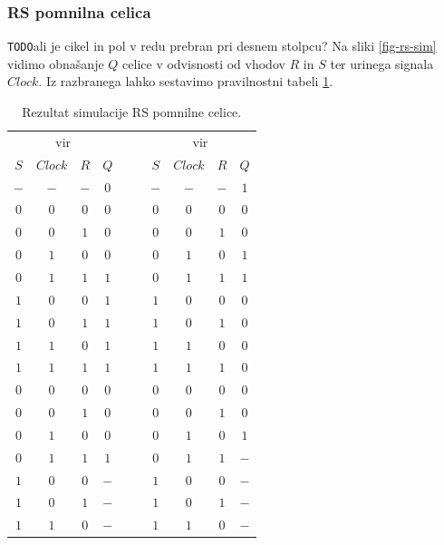 \documentclass[a4paper, 11pt]{article}
\newcommand{\todo}{\textcolor{BrickRed}{\texttt{TODO}}} %
\begin{document}
\subsubsection{RS pomnilna celica}
\todo ali je cikel in pol v redu prebran pri desnem stolpcu?
Na sliki \ref{fig-rs-sim} vidimo obnašanje $Q$ celice v odvisnosti od vhodov $R$ in $S$ ter urinega signala $Clock$. Iz razbranega lahko sestavimo pravilnostni tabeli \ref{tab-rs-sim}.
\begin{table}[h!]
	\centering
	\small
	\begin{tabular}{ccc|ccccc|c}
	\multicolumn{4}{c}{vir \cite{quantum_dot}} & $\quad$ & \multicolumn{4}{c}{vir \cite{a_novel_approach}}\\
	$S$ & $Clock$ & $R$ & $Q$ && $S$ & $Clock$ & $R$ & $Q$ \\
	\cline{1-4} \cline{6-9}
	$-$ & $-$ & $-$ & $0$ && $-$ & $-$ & $-$ & $1$\\
	$0$ & $0$ & $0$ & $0$ && $0$ & $0$ & $0$ & $0$\\
	$0$ & $0$ & $1$ & $0$ && $0$ & $0$ & $1$ & $0$\\
	$0$ & $1$ & $0$ & $0$ && $0$ & $1$ & $0$ & $1$\\
	$0$ & $1$ & $1$ & $1$ && $0$ & $1$ & $1$ & $1$\\
	$1$ & $0$ & $0$ & $1$ && $1$ & $0$ & $0$ & $0$\\
	$1$ & $0$ & $1$ & $1$ && $1$ & $0$ & $1$ & $0$\\
	$1$ & $1$ & $0$ & $1$ && $1$ & $1$ & $0$ & $0$\\
	$1$ & $1$ & $1$ & $1$ && $1$ & $1$ & $1$ & $0$\\
	\cline{1-4} \cline{6-9}
	$0$ & $0$ & $0$ & $0$ && $0$ & $0$ & $0$ & $0$\\
	$0$ & $0$ & $1$ & $0$ && $0$ & $0$ & $1$ & $0$\\
	$0$ & $1$ & $0$ & $0$ && $0$ & $1$ & $0$ & $1$\\
	$0$ & $1$ & $1$ & $1$ && $0$ & $1$ & $1$ & $-$\\
	$1$ & $0$ & $0$ & $-$ && $1$ & $0$ & $0$ & $-$\\
	$1$ & $0$ & $1$ & $-$ && $1$ & $0$ & $1$ & $-$\\
	$1$ & $1$ & $0$ & $-$ && $1$ & $1$ & $0$ & $-$\\
	\end{tabular}
	\caption{Rezultat simulacije RS pomnilne celice.}
	\label{tab-rs-sim}
\end{table}
\end{document}
